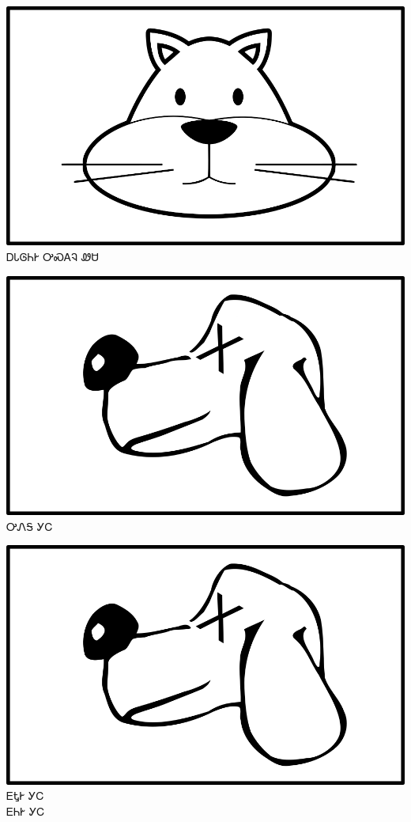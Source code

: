 \documentclass[avery5371]{flashcards}%
\begin{document}
\begin{flashcard}{
\includegraphics[width=0.95\columnwidth,height=.51\columnwidth,keepaspectratio]{../artwork/for-colors/wesa}
}\Huge ᎠᏓᎶᏂᎨ ᎤᏍᎪᎸ ᏪᏌ
\end{flashcard}

\begin{flashcard}{
\includegraphics[width=0.95\columnwidth,height=.51\columnwidth,keepaspectratio]{../artwork/for-colors/gihli-dead}
}\Huge ᎤᏁᎦ ᎩᏟ
\end{flashcard}

\begin{flashcard}{
\includegraphics[width=0.95\columnwidth,height=.51\columnwidth,keepaspectratio]{../artwork/for-colors/gihli-dead}
}\Huge ᎬᎿᎨ ᎩᏟ\\ᎬᏂᎨ ᎩᏟ
\end{flashcard}
\end{document}
